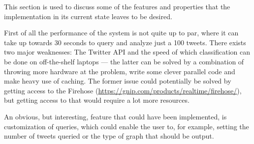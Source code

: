 \documentclass[Main]{subfiles}
\begin{document}



    


This section is used to discuss some of the features and properties that the implementation in its current state leaves to be desired.

First of all the performance of the system is not quite up to par, where it can take up towards 30 seconds to query and analyze just a 100 tweets.
There exists two major weaknesses: The Twitter API and the speed of which classification can be done on off-the-shelf laptops 
--- the latter can be solved by a combination of throwing more hardware at the problem, write some clever parallel code and make heavy use of caching.
The former issue could potentially be solved by getting access to the Firehose (\url{https://gnip.com/products/realtime/firehose/}),
but getting access to that would require a lot more resources.

An obvious, but interesting, feature that could have been implemented, is customization of queries, which could enable the user to, for example, setting the number of tweets queried or the type of graph that should be output.
\end{document}
